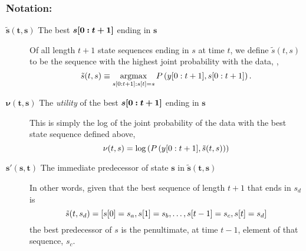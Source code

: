 \subsubsection*{Notation:}
\begin{description}
\item[$\bm{\tilde s (t,s)}$ The best $\bm{s[0:t+1]}$ ending in
  $\bm{s}$] Of all length $t+1$ state sequences ending in $s$ at time
  $t$, we define $\tilde s(t,s)$ to be the sequence with the highest
  joint probability with the data, \ie,
  \begin{equation*}
    \tilde s(t,s) \equiv \operatorname*{argmax}_{ s[0:t+1]:{s}{[t]}=s}
    P\left(y[0:t+1], s[0:t+1] \right).
  \end{equation*}
\item[$\bm{\nu(t,s)}$ The \emph{utility} of the best
  $\bm{s[0:t+1]}$ ending in $\bm{s}$] %
  This is simply the log of the joint
  probability of the data with the best state sequence defined above,
  \ie
  \begin{equation*}
    \nu(t,s) = \log\left( P\left(y[0:t+1], \tilde s(t,s)
      \right) \right)
  \end{equation*}
\item[$\bm{s'(s,t)}$ The immediate predecessor of state $\bm{s}$ in
  $\bm{\tilde s (t,s)}$] In other words, given that the best sequence
  of length $t+1$ that ends in $s_d$ is
  \begin{equation*}
    \tilde s (t,s_d) = \left[ {s}{[0]}=s_a, {s}{[1]}=s_b, \ldots, {s}{[t-1]}=s_c,
      {s}{[t]}= s_d\right]
  \end{equation*}
  the best predecessor of $s$ is the
  penultimate, \ie at time $t-1$, element of that sequence, \ie $s_c$.
\end{description}

